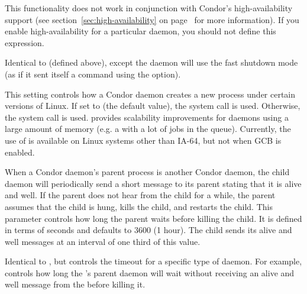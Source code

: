 \begin{description}
  \Note This functionality does not work in conjunction with Condor's
  high-availability support (see section~\ref{sec:high-availability}
  on page~\pageref{sec:high-availability} for more information).
  If you enable high-availability for a particular daemon, you should
  not define this expression.

\item[\Macro{DAEMON\_SHUTDOWN\_FAST}] \label{param:DaemonShutdownFast}
  Identical to  (defined above), except the
  daemon will use the fast shutdown mode (as if it sent itself a
   command using the  option).

\item[\Macro{USE\_CLONE\_TO\_CREATE\_PROCESSES}] \label{param:UseCloneToCreateProcesses}
  This setting controls how a Condor daemon creates a new process under
  certain versions of Linux. If set to  (the default value),
  the  system call is used. Otherwise, the  system
  call is used.  provides scalability improvements for daemons
  using a large amount of memory (e.g. a  with a lot of
  jobs in the queue). Currently, the use of  is available on
  Linux systems other than IA-64, but not when GCB is enabled.

\item[\Macro{NOT\_RESPONDING\_TIMEOUT}] \label{param:NotRespondingTimeout}
  When a Condor daemon's parent process is another Condor daemon, 
  the child daemon will
  periodically send a short message to its parent stating that it is alive
  and well. If the parent does not hear from the child for a while,
  the parent assumes that the child is hung,
  kills the child, and restarts the child. This parameter
  controls how long the parent waits before killing the child. It is defined
  in terms of seconds and defaults to 3600 (1 hour). The child sends its
  alive and well messages at an interval of one third of this value.

\item[\MacroB{<SUBSYS>\_NOT\_RESPONDING\_TIMEOUT}]
  \label{param:SubsysNotRespondingTimeout}
  Identical to , but controls the timeout
  for a specific type of daemon. For example,
   controls how long the
  's parent daemon will wait without receiving an 
  alive and well
  message from the  before killing it.

\end{description}

